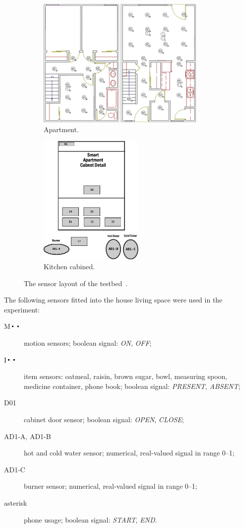 \documentclass[10pt, a4paper, pdflatex, leqno, twoside, openright]{report}
\DeclareMathOperator*{\Bigcdot}{\scalerel*{\cdot}{\bigodot}}
\begin{document}
\begin{figure}[htb]
  \centering%
  \begin{subfigure}[b]{0.6\textwidth}
    \includegraphics[height=6.3cm]{gfx/Chinook_3_Bedroom_TH}
    \caption{Apartment.\label{fig:house:oner:a}}
  \end{subfigure}%
  \begin{subfigure}[b]{0.3\textwidth}
    \includegraphics[height=6.3cm]{gfx/Chinook_Cabinet}
    \caption{Kitchen cabined.\label{fig:house:oner:b}}
  \end{subfigure}%
  \caption[The sensor layout of the testbed.]{The sensor layout of the testbed~\citep{cook2009assessing}.\label{fig:house:oner}}
\end{figure}

The following sensors fitted into the house living space were used in the experiment:
\begin{description}
\item[M$\Bigcdot\Bigcdot$] motion sensors; boolean signal: \emph{ON}, \emph{OFF};
\item[I$\Bigcdot\Bigcdot$] item sensors: oatmeal, raisin, brown sugar, bowl, measuring spoon, medicine container, phone book; boolean signal: \emph{PRESENT}, \emph{ABSENT};
\item[D01] cabinet door sensor; boolean signal: \emph{OPEN}, \emph{CLOSE};
\item[AD1-A, AD1-B] hot and cold water sensor; numerical, real-valued signal in range 0--1;
\item[AD1-C] burner sensor; numerical, real-valued signal in range 0--1;
\item[asterisk] phone usage; boolean signal: \emph{START}, \emph{END}.
\end{description}
\end{document}
